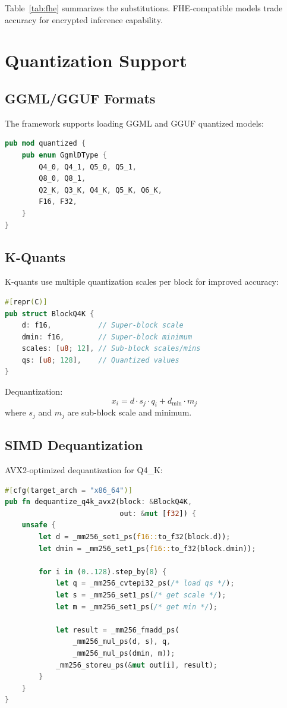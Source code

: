 \documentclass[11pt,twocolumn]{article}
\begin{document}
Table~\ref{tab:fhe} summarizes the substitutions. FHE-compatible models trade accuracy for encrypted inference capability.

\section{Quantization Support}

\subsection{GGML/GGUF Formats}

The framework supports loading GGML and GGUF quantized models:

\begin{lstlisting}[language=Rust]
pub mod quantized {
    pub enum GgmlDType {
        Q4_0, Q4_1, Q5_0, Q5_1,
        Q8_0, Q8_1,
        Q2_K, Q3_K, Q4_K, Q5_K, Q6_K,
        F16, F32,
    }
}
\end{lstlisting}

\subsection{K-Quants}

K-quants use multiple quantization scales per block for improved accuracy:

\begin{lstlisting}[language=Rust]
#[repr(C)]
pub struct BlockQ4K {
    d: f16,           // Super-block scale
    dmin: f16,        // Super-block minimum
    scales: [u8; 12], // Sub-block scales/mins
    qs: [u8; 128],    // Quantized values
}
\end{lstlisting}

Dequantization:
\begin{equation}
    x_i = d \cdot s_j \cdot q_i + d_{\min} \cdot m_j
\end{equation}
where $s_j$ and $m_j$ are sub-block scale and minimum.

\subsection{SIMD Dequantization}

AVX2-optimized dequantization for Q4\_K:

\begin{lstlisting}[language=Rust]
#[cfg(target_arch = "x86_64")]
pub fn dequantize_q4k_avx2(block: &BlockQ4K,
                           out: &mut [f32]) {
    unsafe {
        let d = _mm256_set1_ps(f16::to_f32(block.d));
        let dmin = _mm256_set1_ps(f16::to_f32(block.dmin));

        for i in (0..128).step_by(8) {
            let q = _mm256_cvtepi32_ps(/* load qs */);
            let s = _mm256_set1_ps(/* get scale */);
            let m = _mm256_set1_ps(/* get min */);

            let result = _mm256_fmadd_ps(
                _mm256_mul_ps(d, s), q,
                _mm256_mul_ps(dmin, m));
            _mm256_storeu_ps(&mut out[i], result);
        }
    }
}
\end{lstlisting}
\end{document}
